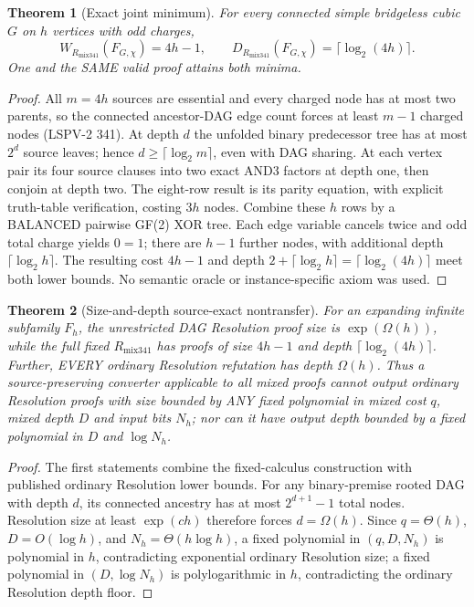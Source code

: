 \documentclass[11pt]{article}
\newtheorem{theorem}{Theorem}
\begin{document}
\begin{theorem}[Exact joint minimum]
For every connected simple bridgeless cubic \(G\) on \(h\) vertices with odd charges,
\[
\boxed{W_{R_{\mathrm{mix341}}}(F_{G,\chi})=4h-1,\qquad
D_{R_{\mathrm{mix341}}}(F_{G,\chi})=\lceil\log_2(4h)\rceil.}
\]
One and the SAME valid proof attains both minima.
\end{theorem}
\begin{proof}
All \(m=4h\) sources are essential and every charged node has at most two parents, so the connected ancestor-DAG edge count forces at least \(m-1\) charged nodes (LSPV-2 341). At depth \(d\) the unfolded binary predecessor tree has at most \(2^d\) source leaves; hence \(d\ge\lceil\log_2 m\rceil\), even with DAG sharing. At each vertex pair its four source clauses into two exact AND3 factors at depth one, then conjoin at depth two. The eight-row result is its parity equation, with explicit truth-table verification, costing \(3h\) nodes. Combine these \(h\) rows by a BALANCED pairwise GF(2) XOR tree. Each edge variable cancels twice and odd total charge yields \(0=1\); there are \(h-1\) further nodes, with additional depth \(\lceil\log_2 h\rceil\). The resulting cost \(4h-1\) and depth \(2+\lceil\log_2 h\rceil=\lceil\log_2(4h)\rceil\) meet both lower bounds. No semantic oracle or instance-specific axiom was used.
\end{proof}

\begin{theorem}[Size-and-depth source-exact nontransfer]
For an expanding infinite subfamily \(F_h\), the unrestricted DAG Resolution proof size is \(\exp(\Omega(h))\), while the full fixed \(R_{\mathrm{mix341}}\) has proofs of size \(4h-1\) and depth \(\lceil\log_2(4h)\rceil\). Further, EVERY ordinary Resolution refutation has depth \(\Omega(h)\). Thus a source-preserving converter applicable to all mixed proofs cannot output ordinary Resolution proofs with size bounded by ANY fixed polynomial in mixed cost \(q\), mixed depth \(D\) and input bits \(N_h\); nor can it have output depth bounded by a fixed polynomial in \(D\) and \(\log N_h\).
\end{theorem}
\begin{proof}
The first statements combine the fixed-calculus construction with published ordinary Resolution lower bounds. For any binary-premise rooted DAG with depth \(d\), its connected ancestry has at most \(2^{d+1}-1\) total nodes. Resolution size at least \(\exp(ch)\) therefore forces \(d=\Omega(h)\). Since \(q=\Theta(h)\), \(D=O(\log h)\), and \(N_h=\Theta(h\log h)\), a fixed polynomial in \((q,D,N_h)\) is polynomial in \(h\), contradicting exponential ordinary Resolution size; a fixed polynomial in \((D,\log N_h)\) is polylogarithmic in \(h\), contradicting the ordinary Resolution depth floor.
\end{proof}
\end{document}
